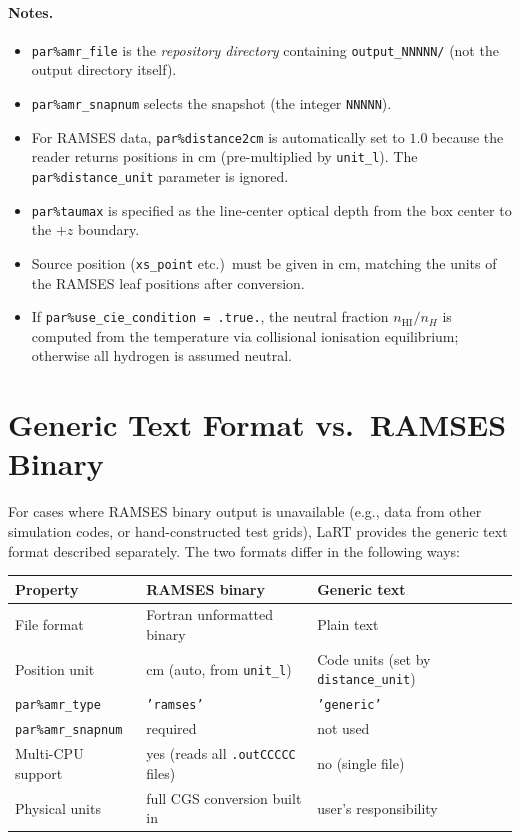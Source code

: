 \documentclass[english,a4paper]{my_memo}
\begin{document}
\paragraph{Notes.}
\begin{itemize}
  \item \texttt{par\%amr\_file} is the \emph{repository directory} containing
        \texttt{output\_NNNNN/} (not the output directory itself).
  \item \texttt{par\%amr\_snapnum} selects the snapshot (the integer
        \texttt{NNNNN}).
  \item For RAMSES data, \texttt{par\%distance2cm} is automatically set to
        $1.0$ because the reader returns positions in cm
        (pre-multiplied by \texttt{unit\_l}).
        The \texttt{par\%distance\_unit} parameter is ignored.
  \item \texttt{par\%taumax} is specified as the line-center optical depth
        from the box center to the $+z$ boundary.
  \item Source position (\texttt{xs\_point} etc.)\ must be given in cm,
        matching the units of the RAMSES leaf positions after conversion.
  \item If \texttt{par\%use\_cie\_condition = .true.}, the neutral fraction
        $n_\mathrm{HI}/n_H$ is computed from the temperature via
        collisional ionisation equilibrium; otherwise all hydrogen is assumed
        neutral.
\end{itemize}

\section{Generic Text Format vs.\ RAMSES Binary}

For cases where RAMSES binary output is unavailable (e.g., data from other
simulation codes, or hand-constructed test grids), LaRT provides the generic
text format described separately.  The two formats differ in the following
ways:

\begin{center}
\begin{tabular}{lll}
\toprule
Property & RAMSES binary & Generic text \\
\midrule
File format       & Fortran unformatted binary & Plain text \\
Position unit     & cm (auto, from \texttt{unit\_l}) & Code units (set by \texttt{distance\_unit}) \\
\texttt{par\%amr\_type} & \texttt{'ramses'}          & \texttt{'generic'} \\
\texttt{par\%amr\_snapnum} & required              & not used \\
Multi-CPU support & yes (reads all \texttt{.outCCCCC} files) & no (single file) \\
Physical units    & full CGS conversion built in & user's responsibility \\
\bottomrule
\end{tabular}
\end{center}
\end{document}
